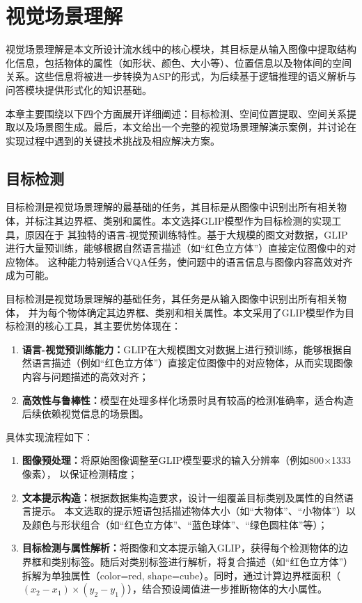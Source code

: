 \section{视觉场景理解}
视觉场景理解是本文所设计流水线中的核心模块，其目标是从输入图像中提取结构化信息，包括物体的属性（如形状、颜色、大小等）、位置信息以及物体间的空间关系。这些信息将被进一步转换为ASP的形式，为后续基于逻辑推理的语义解析与问答模块提供形式化的知识基础。

本章主要围绕以下四个方面展开详细阐述：目标检测、空间位置提取、空间关系提取以及场景图生成。最后，本文给出一个完整的视觉场景理解演示案例，并讨论在实现过程中遇到的关键技术挑战及相应解决方案。
\subsection{目标检测}
目标检测是视觉场景理解的最基础的任务，其目标是从图像中识别出所有相关物体，并标注其边界框、类别和属性。本文选择GLIP模型作为目标检测的实现工具，原因在于
其独特的语言-视觉预训练特性。基于大规模的图文对数据，GLIP进行大量预训练，能够根据自然语言描述（如“红色立方体”）直接定位图像中的对应物体。
这种能力特别适合VQA任务，使问题中的语言信息与图像内容高效对齐成为可能。

目标检测是视觉场景理解的基础任务，其任务是从输入图像中识别出所有相关物体，
并为每个物体确定其边界框、类别和相关属性。本文采用了GLIP模型作为目标检测的核心工具，其主要优势体现在：
\begin{enumerate}[label=(\arabic*),itemsep=0pt,parsep=0pt] 
\item \textbf{语言-视觉预训练能力：}GLIP在大规模图文对数据上进行预训练，能够根据自然语言描述（例如“红色立方体”）直接定位图像中的对应物体，从而实现图像内容与问题描述的高效对齐； 
\item \textbf{高效性与鲁棒性：}模型在处理多样化场景时具有较高的检测准确率，适合构造后续依赖视觉信息的场景图。 
\end{enumerate}

具体实现流程如下：
\begin{enumerate}[label=(\arabic*),itemsep=0pt] 
\item \textbf{图像预处理：}将原始图像调整至GLIP模型要求的输入分辨率（例如800$\times$1333像素），
以保证检测精度； 
\item \textbf{文本提示构造：}根据数据集构造要求，设计一组覆盖目标类别及属性的自然语言提示。
本文选取的提示短语包括描述物体大小（如“大物体”、“小物体”）以及颜色与形状组合（如“红色立方体”、“蓝色球体”、“绿色圆柱体”等）； 
\item \textbf{目标检测与属性解析：}将图像和文本提示输入GLIP，获得每个检测物体的边界框和类别标签。随后对类别标签进行解析，将复合描述（如“红色立方体”）拆解为单独属性（color=red, shape=cube）。同时，通过计算边界框面积（$(x_2 - x_1)\times(y_2 - y_1)$），结合预设阈值进一步推断物体的大小属性。 
\end{enumerate}


